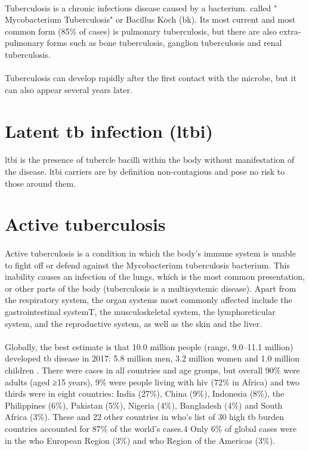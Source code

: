 \paragraph{}
Tuberculosis is a chronic infectious disease caused by a bacterium. called " Mycobacterium Tuberculosis" or Bacillus Koch (\ac{bk}). Its most current and most common form (85\% of cases) is pulmonary tuberculosis, but there are also extra-pulmonary forms such as bone tuberculosis, ganglion tuberculosis and renal tuberculosis.
\paragraph{}
Tuberculosis can develop rapidly after the first contact with the microbe, but it can also appear several years later.
\section{Latent \ac{tb} infection (\ac{ltbi})}
\paragraph{}
\ac{ltbi} is the presence of tubercle bacilli within the body without manifestation of the disease. \ac{ltbi} carriers are by definition non-contagious and pose no risk to those around them.
\section{Active tuberculosis}
\paragraph{}
Active tuberculosis is a condition in which the body’s immune system is unable to fight off or defend against the Mycobacterium tuberculosis bacterium. This inability causes an infection of the lungs, which is the most common presentation, or other parts of the body (tuberculosis is a multisystemic disease). Apart from the respiratory system, the organ systems most commonly affected include the gastrointestinal systemT, the musculoskeletal system, the lymphoreticular system, and the reproductive system, as well as the skin and the liver.
\paragraph{}
Globally, the best estimate is that 10.0 million people (range, 9.0–11.1 million) developed \ac{tb} disease in 2017: 5.8 million men, 3.2 million women and 1.0 million children \cite{TBT:3}. There were cases in all countries and age groups, but overall 90\% were adults (aged ≥15 years), 9\% were people living with \ac{hiv} (72\% in Africa) and two thirds were in eight countries: India (27\%), China (9\%), Indonesia (8\%), the Philippines (6\%), Pakistan (5\%), Nigeria (4\%), Bangladesh (4\%) and South Africa (3\%). These and 22 other countries in \ac{who}’s list of 30 high \ac{tb} burden countries accounted for 87\% of the world’s cases\cite{TBT:3}.4 Only 6\% of global cases were in the \ac{who} European Region (3\%) and \ac{who} Region of the Americas (3\%)\cite{TBT:3}. 
